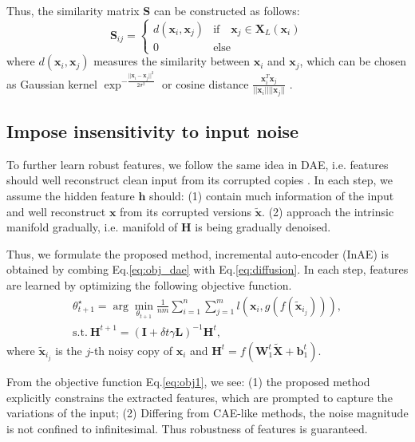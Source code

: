 \documentclass{article}
\def \bb{\mathbf b}
\def \x{\mathbf x}
\def \h{\mathbf h}
\def \HH{\mathbf H}
\def \LL{\mathbf L}
\def \SSS{\mathbf S}
\def \W{\mathbf W}
\def \I{\mathbf I}
\def \X{\mathbf X}
\def \tx{\tilde{\mathbf x}}
\def \st{\text{s.t.}}
\begin{document}
Thus, the similarity matrix $\SSS$ can be constructed as follows:
\begin{equation}
    \SSS_{ij} = \left\{
      \begin{array}{ll}
        d(\x_i, \x_j)& \text{if} \quad \x_j \in \X_L(\x_i)\\
       0 & \text{else}
      \end{array}
      \right.
      \label{eq:simiS}
\end{equation}
where $d(\x_i, \x_j)$ measures the similarity between $\x_i$ and $\x_j$, which can be chosen as Gaussian kernel $\exp^{-\frac{||\x_i - \x_j||^2}{2 \sigma^2}}$ or cosine distance $\frac{\x_i^T \x_j}{||\x_i||||\x_j||}$ \cite{yan2007graph}.

\subsection{ Impose insensitivity to input noise}
To further learn robust features, we follow the same idea in DAE, i.e. features should  well reconstruct clean input from its corrupted copies . In each step, we assume the hidden feature $\h$  should: (1) contain much information of the input and well reconstruct $\x$ from its corrupted versions $\tx$. (2) approach the intrinsic manifold gradually, i.e. manifold of $\HH$ is being gradually denoised.

Thus, we formulate the proposed method, incremental auto-encoder (InAE) is obtained by combing Eq.\ref{eq:obj_dae} with Eq.\ref{eq:diffusion}. In each step, features are learned by optimizing the following objective function.
\begin{equation}
\begin{split}
   \theta^{\star}_{t+1} = \arg \min _{\theta_{t+1}}  \frac{1}{nm}\sum_{i = 1}^n \sum_{j = 1}^m l(\x_i , g(f(\tilde{\x}_{i_j}))),\\
    \st \  \HH^{t+1} = (\I + \delta t \gamma \LL )^{-1} \HH^t,
\end{split}
   \label{eq:obj1}
\end{equation}
where $\tilde{\x}_{i_j}$ is the $j$-th noisy copy of $\x_i$ and $\HH^t = f({\W_1^t} \tilde{\X} + \bb_1^t)$.

From the objective function Eq.\ref{eq:obj1}, we see: (1) the proposed method explicitly constrains the extracted features, which are prompted to capture the variations of the input; (2) Differing from CAE-like methods, the noise magnitude is not confined to infinitesimal. Thus robustness of features is guaranteed.
\end{document}
